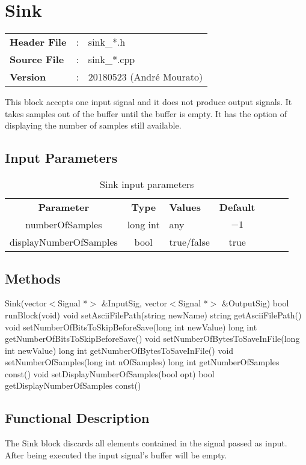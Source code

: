 \clearpage

\section{Sink}

\begin{tcolorbox}	
	\begin{tabular}{p{2.75cm} p{0.2cm} p{10.5cm}} 	
		\textbf{Header File}   &:& sink\_*.h \\
		\textbf{Source File}   &:& sink\_*.cpp \\
        \textbf{Version}       &:& 20180523 (Andr\'e Mourato)
	\end{tabular}
\end{tcolorbox}

This block accepts one input signal and it does not produce output signals. It takes samples out of the buffer until the buffer is empty. It has the option of displaying the number of samples still available.

\subsection*{Input Parameters}

\begin{table}[h]
	\centering
	\begin{tabular}{|c|c|p{30mm}|c|ccp{60mm}}
		\cline{1-4}
		\textbf{Parameter} & \textbf{Type} & \textbf{Values} &   \textbf{Default}& \\ \cline{1-4}
		numberOfSamples & long int & any & $-1$ \\ \cline{1-4}
        displayNumberOfSamples & bool & true/false & true \\ \cline{1-4}
	\end{tabular}
	\caption{Sink input parameters}
	\label{table:sink_in_par}
\end{table}

\subsection*{Methods}
%
Sink(vector$<$Signal *$>$ \&InputSig, vector$<$Signal *$>$ \&OutputSig)
\bigbreak
bool runBlock(void)
\bigbreak
void setAsciiFilePath(string newName)
\bigbreak
string getAsciiFilePath()
\bigbreak
void setNumberOfBitsToSkipBeforeSave(long int newValue)
\bigbreak
long int getNumberOfBitsToSkipBeforeSave()
\bigbreak
void setNumberOfBytesToSaveInFile(long int newValue)
\bigbreak
long int getNumberOfBytesToSaveInFile()
\bigbreak
void setNumberOfSamples(long int nOfSamples)
\bigbreak
long int getNumberOfSamples const()
\bigbreak
void setDisplayNumberOfSamples(bool opt)
\bigbreak
bool getDisplayNumberOfSamples const()


\subsection*{Functional Description}

The Sink block discards all elements contained in the signal passed as input. After being executed the input signal's buffer will be empty.
